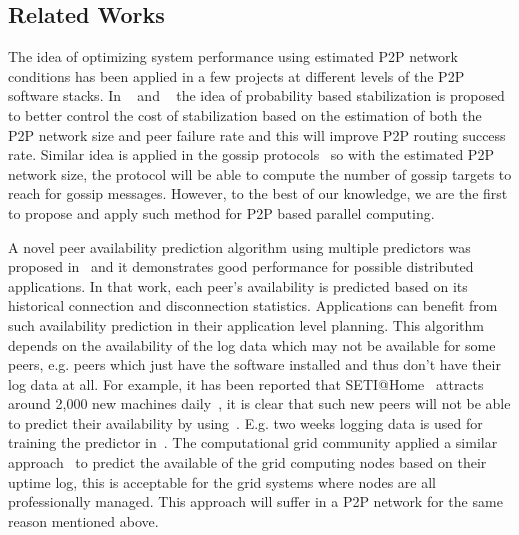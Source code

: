\documentclass[times, 12pt, onecolumn]{article}
\begin{document}
\subsection{Related Works}
The idea of optimizing system performance using estimated P2P network conditions has been applied in
a few projects at different levels of the P2P software stacks. In ~\cite{GhinitaT06} and ~\cite{mspastry} 
the idea of probability based stabilization is proposed to better control the cost of stabilization based 
on the estimation of both the P2P network size and peer failure rate and this will improve P2P routing 
success rate. Similar idea is applied in the gossip protocols~\cite{gossip} so with the estimated P2P 
network size, the protocol will be able to compute the number of gossip targets to reach for gossip messages. 
However, to the best of our knowledge, we are the first to propose and apply such method for P2P based 
parallel computing.

A novel peer availability prediction algorithm using multiple 
predictors was proposed in~\cite{predictor} and it demonstrates good performance for possible distributed 
applications. In that work, each peer's availability is predicted based on its historical connection 
and disconnection statistics. Applications can benefit from such availability prediction 
in their application level planning. This algorithm depends on the availability of the log data which may not be available
for some peers, e.g. peers which just have the software installed and thus don't have their log data
at all. For example, it has been reported that SETI@Home~\cite{setiathome} attracts around 2,000 new 
machines daily~\cite{volunteercomputing}, it is clear that such new peers will not be able to predict 
their availability by using~\cite{predictor}. E.g. two weeks logging data is used for training the 
predictor in~\cite{predictor}. The computational grid community applied a similar approach~\cite{NurmiBW05} 
to predict the available of the grid computing nodes based on their uptime log, this is acceptable for 
the grid systems where nodes are all professionally managed. This approach will suffer in a P2P network 
for the same reason mentioned above. 
\end{document}
